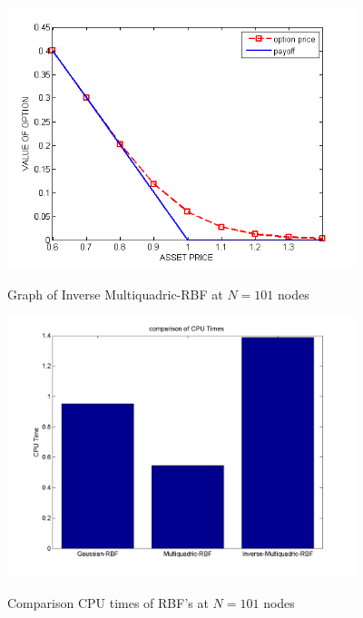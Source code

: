 \documentclass[12pt]{article}
\numberwithin{equation}{section} %
\begin{document}
\newpage
 \begin{figure}[h]
\begin{centering}
\vskip -0.5in
\includegraphics*[height=3in]{Imq101.png}\
\caption{Graph of Inverse Multiquadric-RBF at $N=101$ nodes }
\includegraphics*[height=3in]{cpu.png}\
\caption{Comparison CPU times of RBF's at $N=101$ nodes } \vskip
-0.5in
\end{centering}
\end{figure}
\end{document}
